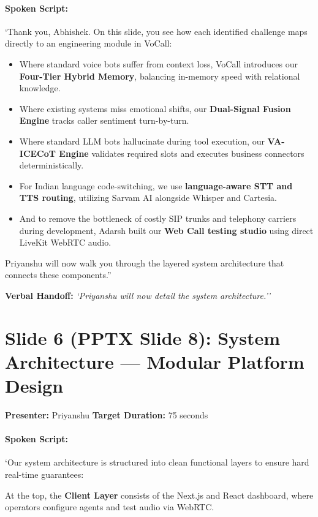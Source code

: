 \documentclass[11pt,a4paper]{article}
\begin{document}
\paragraph{Spoken Script:}
`Thank you, Abhishek. On this slide, you see how each identified challenge maps directly to an engineering module in VoCall:
\begin{itemize}
    \item Where standard voice bots suffer from context loss, VoCall introduces our \textbf{Four-Tier Hybrid Memory}, balancing in-memory speed with relational knowledge.
    \item Where existing systems miss emotional shifts, our \textbf{Dual-Signal Fusion Engine} tracks caller sentiment turn-by-turn.
    \item Where standard LLM bots hallucinate during tool execution, our \textbf{VA-ICECoT Engine} validates required slots and executes business connectors deterministically.
    \item For Indian language code-switching, we use \textbf{language-aware STT and TTS routing}, utilizing Sarvam AI alongside Whisper and Cartesia.
    \item And to remove the bottleneck of costly SIP trunks and telephony carriers during development, Adarsh built our \textbf{Web Call testing studio} using direct LiveKit WebRTC audio.
\end{itemize}
Priyanshu will now walk you through the layered system architecture that connects these components.''

\noindent\textbf{Verbal Handoff:} \textit{`Priyanshu will now detail the system architecture.''}

\vspace{1.5em}

\section*{Slide 6 (PPTX Slide 8): System Architecture — Modular Platform Design}
\textbf{Presenter:} Priyanshu \hfill \textbf{Target Duration:} 75 seconds

\paragraph{Spoken Script:}
`Our system architecture is structured into clean functional layers to ensure hard real-time guarantees:

At the top, the \textbf{Client Layer} consists of the Next.js and React dashboard, where operators configure agents and test audio via WebRTC.
\end{document}
